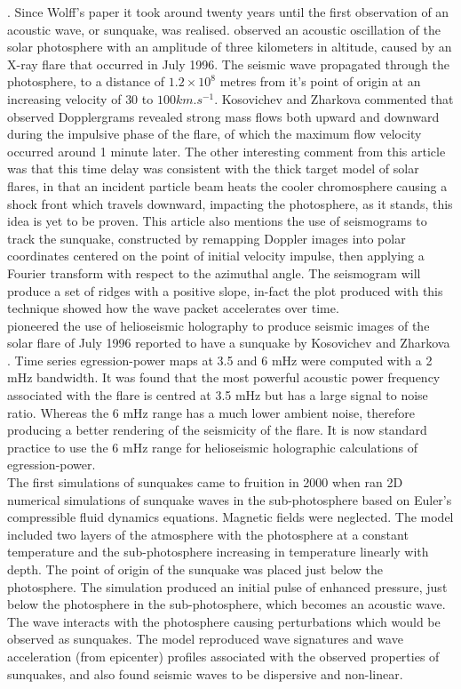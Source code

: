 \citep{1972ApJ...176..833W}. Since Wolff's paper it took around twenty years until the first observation of an acoustic wave, or sunquake, was realised. \cite{1998Natur.393..317K} observed an acoustic oscillation of the solar photosphere with an amplitude of three kilometers in altitude, caused by an X-ray flare that occurred in July 1996. The seismic wave propagated through the photosphere, to a distance of $1.2\times10^{8}$ metres from it's point of origin at an increasing velocity of $30$ to $100 km.s^{-1}$. Kosovichev and Zharkova commented that observed Dopplergrams revealed strong mass flows both upward and downward during the impulsive phase of the flare, of which the maximum flow velocity occurred around 1 minute later. The other interesting comment from this article was that this time delay was consistent with the thick target model of solar flares, in that an incident particle beam heats the cooler chromosphere causing a shock front which travels downward, impacting the photosphere, as it stands, this idea is yet to be proven. This article also mentions the use of seismograms to track the sunquake, constructed by remapping Doppler images into polar coordinates centered on the point of initial velocity impulse, then applying a Fourier transform with respect to the azimuthal angle. The seismogram will produce a set of ridges with a positive slope, in-fact the plot produced with this technique showed how the wave packet accelerates over time. \\


\cite{1999ApJ...513L.143D} pioneered the use of helioseismic holography to produce seismic images of the solar flare of July 1996 reported to have a sunquake by Kosovichev and Zharkova \citep{1998Natur.393..317K}. Time series egression-power maps at 3.5 and 6 mHz were computed with a 2 mHz bandwidth. It was found that the most powerful acoustic power frequency associated with the flare is centred at 3.5 mHz but has a large signal to noise ratio. Whereas the 6 mHz range has a much lower ambient noise, therefore producing a better rendering of the seismicity of the flare. It is now standard practice to use the 6 mHz range for helioseismic holographic calculations of egression-power. \\


The first simulations of sunquakes came to fruition in 2000 when \cite{2000AcA....50..405M} ran 2D numerical simulations of sunquake waves in the sub-photosphere based on Euler's compressible fluid dynamics equations. Magnetic fields were neglected. The model included two layers of the atmosphere with the photosphere at a constant temperature and the sub-photosphere increasing in temperature linearly with depth. The point of origin of the sunquake was placed just below the photosphere. The simulation produced an initial pulse of enhanced pressure, just below the photosphere in the sub-photosphere, which becomes an acoustic wave. The wave interacts with the photosphere causing perturbations which would be observed as sunquakes. The model reproduced wave signatures and wave acceleration (from epicenter) profiles associated with the observed properties of sunquakes, and also found seismic waves to be dispersive and non-linear.\\

